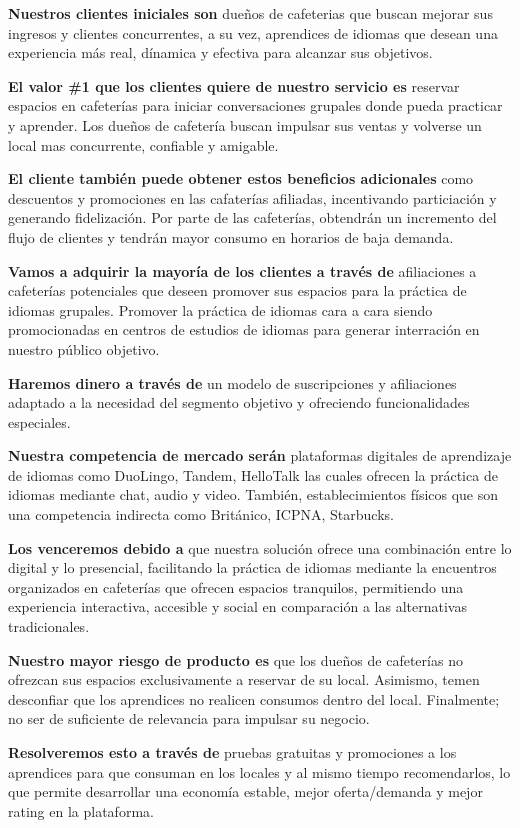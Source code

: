 \textbf{Nuestros clientes iniciales son} dueños de cafeterias que buscan
mejorar sus ingresos y clientes concurrentes, a su vez, aprendices de
idiomas que desean una experiencia más real, dínamica y efectiva para
alcanzar sus objetivos.

\textbf{El valor \#1 que los clientes quiere de nuestro servicio es}
reservar espacios en cafeterías para iniciar conversaciones grupales
donde pueda practicar y aprender. Los dueños de cafetería buscan
impulsar sus ventas y volverse un local mas concurrente, confiable y
amigable.

\textbf{El cliente también puede obtener estos beneficios adicionales}
como descuentos y promociones en las cafaterías afiliadas, incentivando
particiación y generando fidelización. Por parte de las cafeterías,
obtendrán un incremento del flujo de clientes y tendrán mayor consumo en
horarios de baja demanda.

\textbf{Vamos a adquirir la mayoría de los clientes a través de}
afiliaciones a cafeterías potenciales que deseen promover sus espacios
para la práctica de idiomas grupales. Promover la práctica de idiomas
cara a cara siendo promocionadas en centros de estudios de idiomas para
generar interración en nuestro público objetivo.

\textbf{Haremos dinero a través de} un modelo de suscripciones y
afiliaciones adaptado a la necesidad del segmento objetivo y ofreciendo
funcionalidades especiales.

\textbf{Nuestra competencia de mercado serán} plataformas digitales de
aprendizaje de idiomas como DuoLingo, Tandem, HelloTalk las cuales
ofrecen la práctica de idiomas mediante chat, audio y video. También,
establecimientos físicos que son una competencia indirecta como
Británico, ICPNA, Starbucks.

\textbf{Los venceremos debido a} que nuestra solución ofrece una
combinación entre lo digital y lo presencial, facilitando la práctica de
idiomas mediante la encuentros organizados en cafeterías que ofrecen
espacios tranquilos, permitiendo una experiencia interactiva, accesible
y social en comparación a las alternativas tradicionales.

\textbf{Nuestro mayor riesgo de producto es} que los dueños de
cafeterías no ofrezcan sus espacios exclusivamente a reservar de su
local. Asimismo, temen desconfiar que los aprendices no realicen
consumos dentro del local. Finalmente; no ser de suficiente de
relevancia para impulsar su negocio.

\textbf{Resolveremos esto a través de} pruebas gratuitas y promociones a
los aprendices para que consuman en los locales y al mismo tiempo
recomendarlos, lo que permite desarrollar una economía estable, mejor
oferta/demanda y mejor rating en la plataforma.

